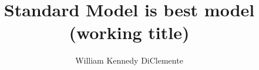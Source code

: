 
\title{Standard Model is best model (working title)} 

\author{William Kennedy DiClemente}

\newcommand{\adviser}{I. Joseph Kroll, Professor, Physics}
\newcommand{\advisershort}{J. Kroll}

\newcommand{\myinstitution}{The University of Pennsylvania}

\newcommand{\chairperson}{Joshua Klein, Professor, Physics}

\newcommand{\committeeOne}{(Committee Prof. 1), Professor, Physics}
\newcommand{\committeeTwo}{(Committee Prof. 2), Associate Professor, Physics}
\newcommand{\committeeThree}{(Committee Prof. 3), Professor, Physics}
\newcommand{\committeeFour}{(Committee Prof. 4), Professor, Physics}






